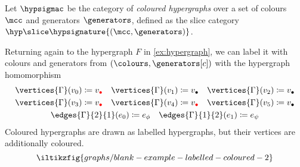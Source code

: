 \begin{definition}
    Let \(\hypsigmac\) be the category of \emph{coloured hypergraphs} over a set
    of colours \(\mcc\) and generators \(\generators\), defined as the slice
    category \(\hyp \slice \hypsignature{(\mcc,\generators)}\).
\end{definition}

\begin{example}\label{ex:coloured-hypergraph}
    Returning again to the hypergraph \(F\) in \cref{ex:hypergraph}, we can
    label it with colours and generators from \((\colours,\generators[c])\) with
    the hypergraph homomorphism
    \begin{gather*}
        \vertices{\Gamma}(v_0) \coloneqq v_{\redbullet}
        \quad
        \vertices{\Gamma}(v_1) \coloneqq v_{\bullet}
        \quad
        \vertices{\Gamma}(v_2) \coloneqq v_{\bullet}
        \\
        \vertices{\Gamma}(v_3) \coloneqq v_{\redbullet}
        \quad
        \vertices{\Gamma}(v_4) \coloneqq v_{\redbullet}
        \quad
        \vertices{\Gamma}(v_5) \coloneqq v_{\bullet}
        \\
        \edges{\Gamma}{2}{1}(e_0) \coloneqq e_{\phi}
        \quad
        \edges{\Gamma}{1}{2}(e_1) \coloneqq e_{\psi}
    \end{gather*}
    Coloured hypergraphs are drawn as labelled hypergraphs, but their vertices
    are additionally coloured.
    \[
        \iltikzfig{graphs/blank-example-labelled-coloured-2}
    \]
\end{example}